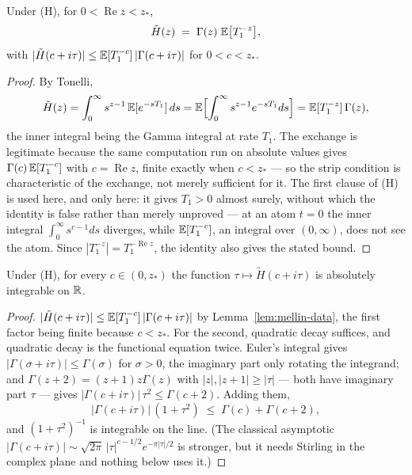 \begin{lemma}\label{lem:mellin-data}
Under (H), for $0 < \operatorname{Re} z < z_*$,
\[
  \tilde H(z) \;=\; \Gamma(z)\;\mathbb{E}\bigl[T_1^{-z}\bigr],
\]
with $|\tilde H(c + i\tau)| \le \mathbb{E}[T_1^{-c}]\,|\Gamma(c+i\tau)|$ for $0 < c < z_*$.
\end{lemma}

\begin{proof}
By Tonelli,
\[
  \tilde H(z) = \int_0^\infty s^{z-1}\,\mathbb{E}[e^{-sT_1}]\,ds
  = \mathbb{E}\Bigl[\int_0^\infty s^{z-1}e^{-sT_1}ds\Bigr]
  = \mathbb{E}[T_1^{-z}]\,\Gamma(z),
\]
the inner integral being the Gamma integral at rate $T_1$. The exchange is legitimate because
the same computation run on absolute values gives $\Gamma(c)\,\mathbb{E}[T_1^{-c}]$ with
$c = \operatorname{Re} z$, finite exactly when $c < z_*$ --- so the strip condition is
characteristic of the exchange, not merely sufficient for it. The first clause of (H) is used
here, and only here: it gives $T_1 > 0$ almost surely, without which the identity is false
rather than merely unproved --- at an atom $t = 0$ the inner integral $\int_0^\infty s^{c-1}ds$
diverges, while $\mathbb{E}[T_1^{-c}]$, an integral over $(0,\infty)$, does not see the atom. Since
$|T_1^{-z}| = T_1^{-\operatorname{Re} z}$, the identity also gives the stated bound.
\end{proof}

\begin{lemma}\label{lem:mellin-vertical}
Under (H), for every $c \in (0, z_*)$ the function $\tau \mapsto \tilde H(c + i\tau)$ is
absolutely integrable on $\mathbb{R}$.
\end{lemma}

\begin{proof}
$|\tilde H(c+i\tau)| \le \mathbb{E}[T_1^{-c}]\,|\Gamma(c+i\tau)|$ by Lemma~\ref{lem:mellin-data}, the
first factor being finite because $c < z_*$. For the second, quadratic decay suffices, and
quadratic decay is the functional equation twice. Euler's integral gives
$|\Gamma(\sigma+i\tau)| \le \Gamma(\sigma)$ for $\sigma > 0$, the imaginary part only rotating
the integrand; and $\Gamma(z+2) = (z+1)z\Gamma(z)$ with $|z|, |z+1| \ge |\tau|$ --- both have
imaginary part $\tau$ --- gives $|\Gamma(c+i\tau)|\,\tau^2 \le \Gamma(c+2)$. Adding them,
\[
  |\Gamma(c+i\tau)|\,(1+\tau^2) \;\le\; \Gamma(c) + \Gamma(c+2),
\]
and $(1+\tau^2)^{-1}$ is integrable on the line. (The classical asymptotic
$|\Gamma(c+i\tau)| \sim \sqrt{2\pi}\,|\tau|^{c-1/2}e^{-\pi|\tau|/2}$ is stronger, but it needs
Stirling in the complex plane and nothing below uses it.)
\end{proof}

